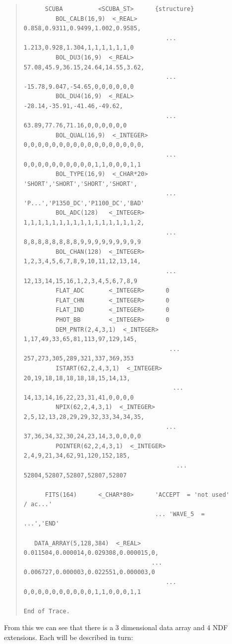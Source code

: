 \documentclass[twoside,11pt]{article}
\newenvironment{myquote}{\begin{quote}\begin{small}}{\end{small}\end{quote}}
\renewcommand{\_}{\texttt{\symbol{95}}}
\begin{document}
\begin{myquote}
\begin{verbatim}
      SCUBA          <SCUBA_ST>      {structure}
         BOL_CALB(16,9)  <_REAL>        0.858,0.9311,0.9499,1.002,0.9585,
                                        ... 1.213,0.928,1.304,1,1,1,1,1,1,0
         BOL_DU3(16,9)  <_REAL>         57.08,45.9,36.15,24.64,14.55,3.62,
                                        ... -15.78,9.047,-54.65,0,0,0,0,0,0
         BOL_DU4(16,9)  <_REAL>         -28.14,-35.91,-41.46,-49.62,
                                        ... 63.89,77.76,71.16,0,0,0,0,0,0
         BOL_QUAL(16,9)  <_INTEGER>     0,0,0,0,0,0,0,0,0,0,0,0,0,0,0,0,0,
                                        ... 0,0,0,0,0,0,0,0,0,0,1,1,0,0,0,1,1
         BOL_TYPE(16,9)  <_CHAR*20>     'SHORT','SHORT','SHORT','SHORT',
                                        ... 'P...','P1350_DC','P1100_DC','BAD'
         BOL_ADC(128)   <_INTEGER>      1,1,1,1,1,1,1,1,1,1,1,1,1,1,1,1,2,
                                        ... 8,8,8,8,8,8,8,8,9,9,9,9,9,9,9,9,9
         BOL_CHAN(128)  <_INTEGER>      1,2,3,4,5,6,7,8,9,10,11,12,13,14,
                                        ... 12,13,14,15,16,1,2,3,4,5,6,7,8,9
         FLAT_ADC       <_INTEGER>      0
         FLAT_CHN       <_INTEGER>      0
         FLAT_IND       <_INTEGER>      0
         PHOT_BB        <_INTEGER>      0
         DEM_PNTR(2,4,3,1)  <_INTEGER>   1,17,49,33,65,81,113,97,129,145,
                                         ... 257,273,305,289,321,337,369,353
         ISTART(62,2,4,3,1)  <_INTEGER>   20,19,18,18,18,18,18,15,14,13,
                                          ... 14,13,14,16,22,23,31,41,0,0,0,0
         NPIX(62,2,4,3,1)  <_INTEGER>   2,5,12,13,28,29,29,32,33,34,34,35,
                                        ... 37,36,34,32,30,24,23,14,3,0,0,0,0
         POINTER(62,2,4,3,1)  <_INTEGER>   2,4,9,21,34,62,91,120,152,185,
                                           ... 52804,52807,52807,52807,52807
 
      FITS(164)      <_CHAR*80>      'ACCEPT  = 'not used'           / ac...'
                                     ... 'WAVE_5  =                 ...','END'
 
   DATA_ARRAY(5,128,384)  <_REAL>   0.011504,0.000014,0.029308,0.000015,0,
                                    ... 0.006727,0.000003,0.022551,0.000003,0
                                        ... 0,0,0,0,0,0,0,0,0,0,1,1,0,0,0,1,1

End of Trace.
\end{verbatim}
\end{myquote}

From this we can see that there is a 3 dimensional data array and 4 NDF
extensions. Each will be described in turn:
\end{document}
